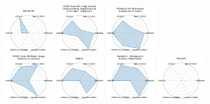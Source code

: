 \begin{figure}[ht!]
\includegraphics[width=0.1900\textwidth]{images/math-_radar.pdf}
\includegraphics[width=0.1900\textwidth]{images/curie_scientific_long-context_understanding_reasoning_and_information_extraction_radar.pdf}
\includegraphics[width=0.1900\textwidth]{images/feabench_finite_element_analysis_benchmark_radar.pdf}
\\[1ex]
\includegraphics[width=0.1900\textwidth]{images/spiqa_scientific_paper_image_question_answering_radar.pdf}
\includegraphics[width=0.1900\textwidth]{images/medqa_radar.pdf}
\includegraphics[width=0.1900\textwidth]{images/baisbench_biological_ai_scientist_benchmark_radar.pdf}
\includegraphics[width=0.1900\textwidth]{images/molgen_radar.pdf}

\end{figure}
